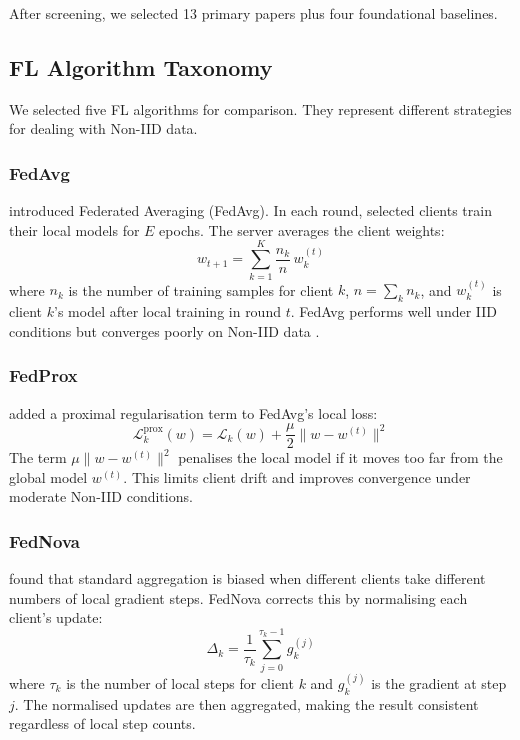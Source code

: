 \documentclass[12pt, a4paper]{article}
\begin{document}
After screening, we selected 13 primary papers plus four foundational baselines.

\subsection{FL Algorithm Taxonomy}
\label{sec:algorithms}

We selected five FL algorithms for comparison. They represent different strategies for dealing with Non-IID data.

\subsubsection{FedAvg}

\citet{mcmahan2017} introduced Federated Averaging (FedAvg). In each round, selected clients train their local models for $E$ epochs. The server averages the client weights:
\begin{equation}
    w_{t+1} = \sum_{k=1}^{K} \frac{n_k}{n} \, w_k^{(t)}
    \label{eq:fedavg}
\end{equation}
where $n_k$ is the number of training samples for client $k$, $n = \sum_k n_k$, and $w_k^{(t)}$ is client $k$'s model after local training in round $t$. FedAvg performs well under IID conditions but converges poorly on Non-IID data \citep{zhao2018federated}.

\subsubsection{FedProx}

\citet{li2020fedprox} added a proximal regularisation term to FedAvg's local loss:
\begin{equation}
    \mathcal{L}_k^{\text{prox}}(w) = \mathcal{L}_k(w) + \frac{\mu}{2} \|w - w^{(t)}\|^2
    \label{eq:fedprox}
\end{equation}
The term $\mu \|w - w^{(t)}\|^2$ penalises the local model if it moves too far from the global model $w^{(t)}$. This limits client drift and improves convergence under moderate Non-IID conditions.

\subsubsection{FedNova}

\citet{wang2020fednova} found that standard aggregation is biased when different clients take different numbers of local gradient steps. FedNova corrects this by normalising each client's update:
\begin{equation}
    \Delta_k = \frac{1}{\tau_k} \sum_{j=0}^{\tau_k - 1} g_k^{(j)}
    \label{eq:fednova}
\end{equation}
where $\tau_k$ is the number of local steps for client $k$ and $g_k^{(j)}$ is the gradient at step $j$. The normalised updates are then aggregated, making the result consistent regardless of local step counts.
\end{document}
